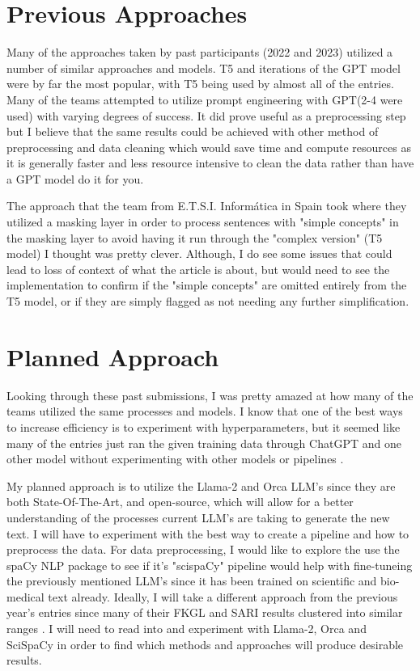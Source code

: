 \documentclass[runningheads]{llncs}
\begin{document}
\section{Previous Approaches}
Many of the approaches taken by past participants (2022 and 2023) utilized a number of similar approaches and models. T5 and iterations of the GPT model were by far the most popular, with T5 being used by almost all of the entries\cite{ref_article1,ref_article2,ref_article3,ref_article4,ref_article6}. Many of the teams attempted to utilize prompt engineering with GPT(2-4 were used) \cite{ref_article1,ref_article2,ref_article4,ref_article6}with varying degrees of success. It did prove useful as a preprocessing step \cite{ref_article6} but I believe that the same results could be achieved with other method of preprocessing and data cleaning which would save time and compute resources as it is generally faster and less resource intensive to clean the data rather than have a GPT model do it for you. 

The approach that the team from E.T.S.I. Informática in Spain took where they utilized a masking layer in order to process sentences with "simple concepts" in the masking layer to avoid having it run through the "complex version" (T5 model) I thought was pretty clever\cite{ref_article3}. Although, I do see some issues that could lead to loss of context of what the article is about, but would need to see the implementation to confirm if the "simple concepts" are omitted entirely from the T5 model, or if they are simply flagged as not needing any further simplification.

\section{Planned Approach}
Looking through these past submissions, I was pretty amazed at how many of the teams utilized the same processes and models. I know that one of the best ways to increase efficiency is to experiment with hyperparameters, but it seemed like many of the entries just ran the given training data through ChatGPT and one other model without experimenting with other models or pipelines \cite{ref_article1,ref_article2,ref_article4,ref_article6}.

My planned approach is to utilize the Llama-2 and Orca LLM's since they are both State-Of-The-Art, and open-source, which will allow for a better understanding of the processes current LLM's are taking to generate the new text. I will have to experiment with the best way to create a pipeline and how to preprocess the data. For data preprocessing, I would like to explore the use the spaCy NLP package to see if it's "scispaCy" pipeline would help with fine-tuneing the previously mentioned LLM's since it has been trained on scientific and bio-medical text already. Ideally, I will take a different approach from the previous year's entries since many of their FKGL and SARI results clustered into similar ranges \cite{ref_article1,ref_article2,ref_article4,ref_article6}. I will need to read into and experiment with Llama-2, Orca and SciSpaCy in order to find which methods and approaches will produce desirable results.  
\end{document}

